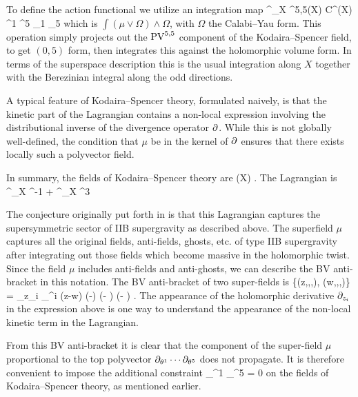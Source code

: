 \documentclass[../main.tex]{subfiles}
\begin{document}
To define the action functional we utilize an integration map
\beqn\label{eqn:cyintegral}
\int^\Omega_X \colon \PV^{5,5}(X) \simeq C^\infty(X) \theta^1 \cdots \theta^5 \br \theta_1 \cdots \br \theta_5 \to \C
\eeqn
which is $\int ( \mu \vee \Omega) \wedge \Omega$, with $\Omega$ the Calabi--Yau form.
This operation simply projects out the ${\rm PV}^{5,5}$ component of the Kodaira--Spencer field, to get $(0,5)$ form, then integrates this against the holomorphic volume form.
In terms of the superspace description this is the usual integration along $X$ together with the Berezinian integral along the odd directions.

A typical feature of Kodaira--Spencer theory, formulated naively, is that the kinetic part of the Lagrangian contains a non-local expression involving the distributional inverse of the divergence operator $\partial$.
While this is not globally well-defined, the condition that $\mu$ be in the kernel of $\partial$ ensures that there exists locally such a polyvector field. 

In summary, the fields of Kodaira--Spencer theory are
\beqn
\PV(X) \cap \ker \del .
\eeqn
The Lagrangian is
\beqn
{} \int^\Omega_X \mu \dbar \del^{-1} \mu +  \int^\Omega_X \mu^3 
\eeqn

The conjecture originally put forth in \cite{CLsugra} is that this Lagrangian captures the supersymmetric sector of IIB supergravity as described above.
The superfield $\mu$ captures all the original fields, anti-fields, ghosts, etc. of type IIB supergravity after integrating out those fields which become massive in the holomorphic twist.
Since the field $\mu$ includes anti-fields and anti-ghosts, we can describe the BV anti-bracket in this notation.
The BV anti-bracket of two super-fields is
\beqn
\{\mu(z,\zbar,\theta,\br \theta), \mu(w,\wbar,\eta,\br \eta)\} = \del_{z_i} \del_{\theta^i} \delta(z-w) \delta(\zbar-\wbar) (\br \theta - \br \eta) (\theta - \eta)  .
\eeqn
The appearance of the holomorphic derivative $\partial_{z_i}$ in the expression above is one way to understand the appearance of the non-local kinetic term in the Lagrangian.

From this BV anti-bracket it is clear that the component of the super-field $\mu$ proportional to the top polyvector $\partial_{\theta^1} \cdots \partial_{\theta^5}$ does not propagate. 
It is therefore convenient to impose the additional constraint 
\beqn
\del_{\theta^1} \cdots \del_{\theta^5} \mu = 0 
\eeqn
on the fields of Kodaira--Spencer theory, as mentioned earlier.
\end{document}
